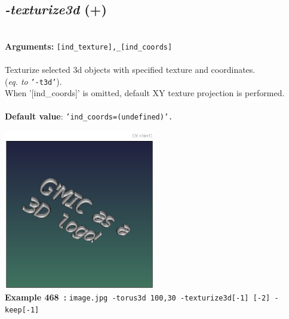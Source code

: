 \documentclass[a4paper,11pt,twoside]{book}
\begin{document}
\subsection{\emph{-texturize3d} (+)}\vspace*{-0.5em}
~\\\textbf{Arguments: } 
{\small \texttt{[ind\_texture],\_[ind\_coords]}}\\~\\
Texturize selected 3d objects with specified texture and coordinates.
~\\(\emph{eq. to} {\small \texttt{'-t3d'}}).
~\\When '[ind\_coords]' is omitted, default XY texture projection is performed.
~\\~\\\textbf{Default value}: {\small \texttt{'ind\_coords=(undefined)'.}}
\begin{center}\includegraphics[keepaspectratio=true,height=7cm,width=\textwidth]{img/gmic_def468.jpg}\\
{\footnotesize \textbf{Example 468~:} \texttt{image.jpg -torus3d 100,30 -texturize3d[-1] [-2] -keep[-1]}}
\end{center}
\end{document}
